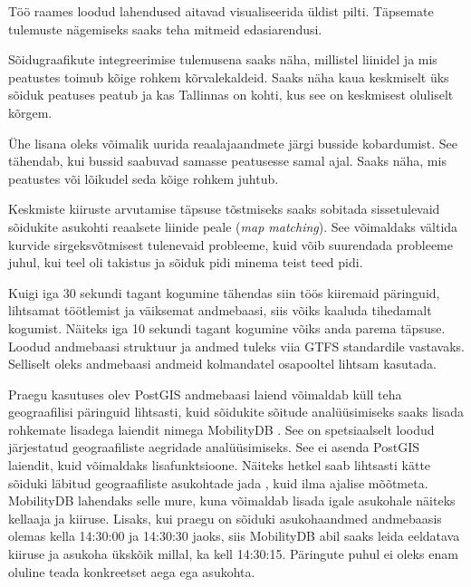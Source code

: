 Töö raames loodud lahendused aitavad visualiseerida üldist pilti. Täpsemate tulemuste nägemiseks saaks teha mitmeid edasiarendusi.

Sõidugraafikute integreerimise tulemusena saaks näha, millistel liinidel ja mis peatustes toimub kõige rohkem kõrvalekaldeid. Saaks näha kaua keskmiselt üks sõiduk peatuses peatub ja kas Tallinnas on kohti, kus see on keskmisest oluliselt kõrgem.

Ühe lisana oleks võimalik uurida reaalajaandmete järgi busside kobardumist. See tähendab, kui bussid saabuvad samasse peatusesse samal ajal. Saaks näha, mis peatustes või lõikudel seda kõige rohkem juhtub.

Keskmiste kiiruste arvutamise täpsuse tõstmiseks saaks sobitada sissetulevaid sõidukite asukohti reaalsete liinide peale (\textit{map matching}). See võimaldaks vältida kurvide sirgeksvõtmisest tulenevaid probleeme, kuid võib suurendada probleeme juhul, kui teel oli takistus ja sõiduk pidi minema teist teed pidi. 

Kuigi iga 30 sekundi tagant kogumine tähendas siin töös kiiremaid päringuid, lihtsamat töötlemist ja väiksemat andmebaasi, siis võiks kaaluda tihedamalt kogumist. Näiteks iga 10 sekundi tagant kogumine võiks anda parema täpsuse. Loodud andmebaasi struktuur ja andmed tuleks viia GTFS standardile vastavaks. Selliselt oleks andmebaasi andmeid kolmandatel osapooltel lihtsam kasutada.

Praegu kasutuses olev PostGIS andmebaasi laiend võimaldab küll teha geograafilisi päringuid lihtsasti, kuid sõidukite sõitude analüüsimiseks saaks lisada rohkemate lisadega laiendit nimega MobilityDB \cite{mobilitydb}. See on spetsiaalselt loodud järjestatud geograafiliste aegridade analüüsimiseks. See ei asenda PostGIS laiendit, kuid võimaldaks lisafunktsioone. Näiteks hetkel saab lihtsasti kätte sõiduki läbitud geograafiliste asukohtade jada \cite{postgis}, kuid ilma ajalise mõõtmeta. MobilityDB lahendaks selle mure, kuna võimaldab lisada igale asukohale näiteks kellaaja ja kiiruse. Lisaks, kui praegu on sõiduki asukohaandmed andmebaasis olemas kella 14:30:00 ja  14:30:30 jaoks, siis MobilityDB abil saaks leida eeldatava kiiruse ja asukoha ükskõik millal, ka kell 14:30:15. Päringute puhul ei oleks enam oluline teada konkreetset aega ega asukohta.

